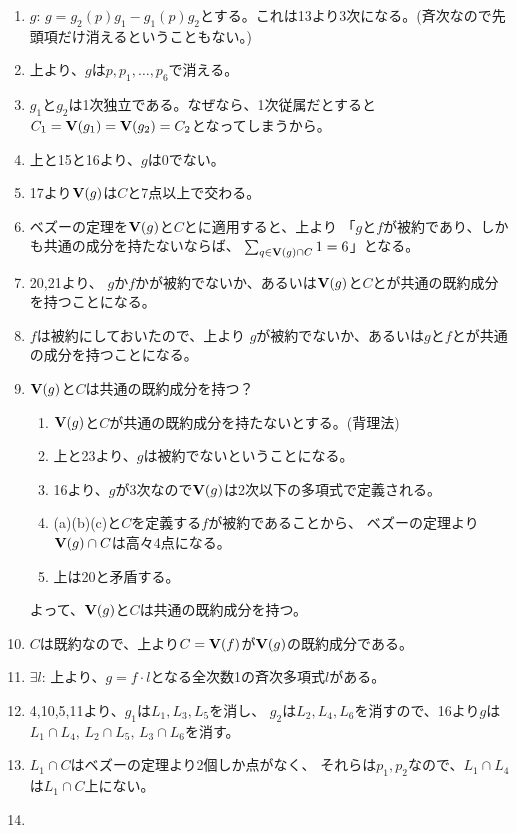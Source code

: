 \begin{myproof}
\begin{enumerate}
    \item $g$:
    $g=g_2(p)g_1 - g_1(p)g_2$とする。これは13より3次になる。(斉次なので先頭項だけ消えるということもない。)
    \item
    上より、$g$は$p,p_1,\dots,p_6$で消える。
    \item
    $g_1$と$g_2$は1次独立である。なぜなら、1次従属だとすると$C_1 = \textbf V(g_1) = \textbf V(g_2) = C_2$となってしまうから。
    \item
    上と15と16より、$g$は0でない。
    \item
    17より$\textbf V(g)$は$C$と7点以上で交わる。
    \item
    ベズーの定理を$\textbf V(g)$と$C$とに適用すると、上より
    「$g$と$f$が被約であり、しかも共通の成分を持たないならば、
      $\sum_{q \in \textbf V(g)\cap C} 1 = 6$」となる。
    \item
    20,21より、
    $g$か$f$かが被約でないか、あるいは$\textbf V(g)$と$C$とが共通の既約成分を持つことになる。
    \item
    $f$は被約にしておいたので、上より
    $g$が被約でないか、あるいは$g$と$f$とが共通の成分を持つことになる。
    \item
    $\textbf V(g)$と$C$は共通の既約成分を持つ？
    \begin{enumerate}
      \item $\textbf V(g)$と$C$が共通の既約成分を持たないとする。(背理法)
      \item
        上と23より、$g$は被約でないということになる。
      \item
        16より、$g$が3次なので$\textbf V(g)$は2次以下の多項式で定義される。
      \item
        (a)(b)(c)と$C$を定義する$f$が被約であることから、
        ベズーの定理より$\textbf V(g)\cap C$は高々4点になる。
      \item
      上は20と矛盾する。
    \end{enumerate}
    よって、$\textbf V(g)$と$C$は共通の既約成分を持つ。
    \item
    $C$は既約なので、上より$C=\textbf V(f)$が$\textbf V(g)$の既約成分である。
    \item $\exists l$:
    上より、$g=f\cdot l$となる全次数1の斉次多項式$l$がある。
    \item
    4,10,5,11より、$g_1$は$L_1,L_3,L_5$を消し、
    $g_2$は$L_2,L_4,L_6$を消すので、16より$g$は
    $L_1\cap L_4,\, L_2 \cap L_5,\, L_3 \cap L_6$を消す。
    \item
    $L_1 \cap C$はベズーの定理より2個しか点がなく、
    それらは$p_1,p_2$なので、$L_1\cap L_4$は$L_1\cap C$上にない。
    \item

\end{enumerate}
\end{myproof}
